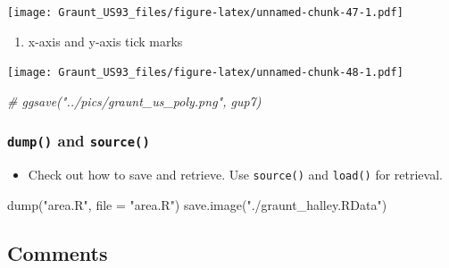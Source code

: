 \documentclass[
]{article}
\newenvironment{Shaded}{\begin{snugshade}}{\end{snugshade}}
\newcommand{\AttributeTok}[1]{\textcolor[rgb]{0.77,0.63,0.00}{#1}}
\newcommand{\CommentTok}[1]{\textcolor[rgb]{0.56,0.35,0.01}{\textit{#1}}}
\newcommand{\FunctionTok}[1]{\textcolor[rgb]{0.00,0.00,0.00}{#1}}
\newcommand{\NormalTok}[1]{#1}
\newcommand{\OtherTok}[1]{\textcolor[rgb]{0.56,0.35,0.01}{#1}}
\newcommand{\SpecialCharTok}[1]{\textcolor[rgb]{0.00,0.00,0.00}{#1}}
\providecommand{\tightlist}{%
  \setlength{\itemsep}{0pt}\setlength{\parskip}{0pt}}
\begin{document}
\texttt{[image: Graunt\_US93\_files/figure-latex/unnamed-chunk-47-1.pdf]}

\begin{enumerate}
\def\labelenumi{\arabic{enumi}.}
\setcounter{enumi}{3}
\tightlist
\item
  x-axis and y-axis tick marks
\end{enumerate}

\begin{Shaded}
\end{Shaded}

\texttt{[image: Graunt\_US93\_files/figure-latex/unnamed-chunk-48-1.pdf]}

\begin{Shaded}
\begin{Highlighting}[]
\CommentTok{\# ggsave("../pics/graunt\_us\_poly.png", gup7)}
\end{Highlighting}
\end{Shaded}

\hypertarget{dump-and-source}{%
\subsubsection{\texorpdfstring{\texttt{dump()} and
\texttt{source()}}{dump() and source()}}\label{dump-and-source}}

\begin{itemize}
\tightlist
\item
  Check out how to save and retrieve. Use \texttt{source()} and
  \texttt{load()} for retrieval.
\end{itemize}

\begin{Shaded}
\begin{Highlighting}[]
\NormalTok{dump("area.R", file = "area.R")}
\NormalTok{save.image("./graunt\_halley.RData")}
\end{Highlighting}
\end{Shaded}

\hypertarget{comments}{%
\subsection{Comments}\label{comments}}
\end{document}
